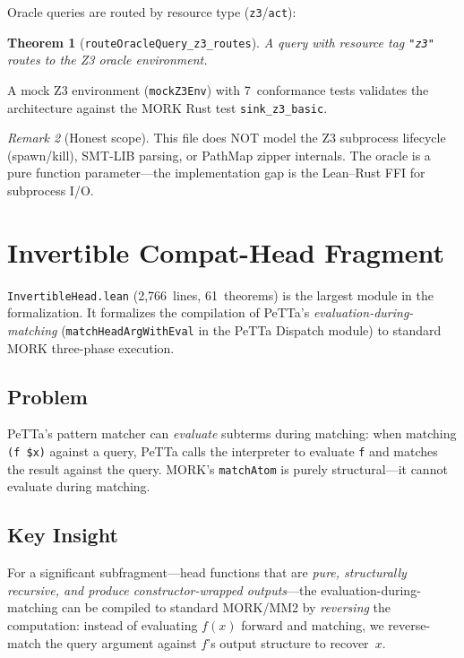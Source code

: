 \documentclass[11pt]{article}
\newtheorem{theorem}{Theorem}[section]
\theoremstyle{definition}
\theoremstyle{remark}
\newtheorem{remark}[theorem]{Remark}
\newcommand{\MORK}{\textup{MORK}}
\begin{document}
\noindent
Oracle queries are routed by resource type (\texttt{z3}/\texttt{act}):

\begin{theorem}[\texttt{routeOracleQuery\_z3\_routes}]
A query with resource tag \texttt{"z3"} routes to the Z3 oracle
environment.
\end{theorem}

\noindent
A mock Z3 environment (\texttt{mockZ3Env}) with 7~conformance tests
validates the architecture against the \MORK{} Rust test
\texttt{sink\_z3\_basic}.

\begin{remark}[Honest scope]
This file does NOT model the Z3 subprocess lifecycle (spawn/kill),
SMT-LIB parsing, or PathMap zipper internals.  The oracle is a pure
function parameter---the implementation gap is the Lean--Rust FFI for
subprocess I/O.
\end{remark}

\section{Invertible Compat-Head Fragment}
\label{sec:invertiblehead}

\texttt{InvertibleHead.lean} (2{,}766~lines, 61~theorems) is the largest
module in the formalization.  It formalizes the compilation of PeTTa's
\emph{evaluation-during-matching} (\texttt{matchHeadArgWithEval} in the
PeTTa Dispatch module) to standard \MORK{} three-phase execution.

\subsection{Problem}

PeTTa's pattern matcher can \emph{evaluate} subterms during matching:
when matching \texttt{(f \$x)} against a query, PeTTa calls the
interpreter to evaluate \texttt{f} and matches the result against the
query.  \MORK{}'s \texttt{matchAtom} is purely structural---it cannot
evaluate during matching.

\subsection{Key Insight}

For a significant subfragment---head functions that are \emph{pure,
structurally recursive, and produce constructor-wrapped outputs}---the
evaluation-during-matching can be compiled to standard \MORK{}/MM2 by
\emph{reversing} the computation: instead of evaluating $f(x)$ forward
and matching, we reverse-match the query argument against $f$'s output
structure to recover~$x$.
\end{document}
